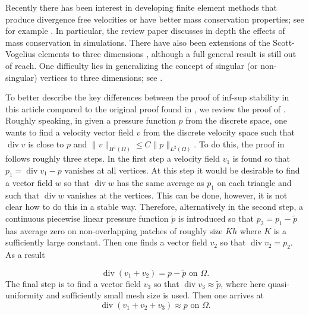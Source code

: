 \documentclass[11pt]{amsart}
\numberwithin{equation}{section}
\newcommand{\dive}{\operatorname{div}}
\theoremstyle{definition}
\begin{document}
Recently there has been interest in developing finite element methods that produce divergence free velocities or have better mass conservation properties; see for example 
\cite{
 arnold1992quadratic,
 cockburn2005locally,
 evans2013isogeometric,
 falk2013stokes,
 guzman2012family,
 guzman2014conforming2,
 guzman2014conforming,
2016arXiv160508657H,
john2016divergence,
 linke2009collision,
 lovadina2015divergence,
 neilan2015discrete,
 ref:QinThesis,
 tai2006discrete,
 zhang2007family,
zhang2011divergence}.  
In particular, the review paper \cite{john2016divergence} discusses in depth the effects of mass conservation in simulations. There have also been 
  extensions of the Scott-Vogelius elements to three dimensions \cite{zhang2007family, zhang2011divergence, neilan2015discrete}, although a full general result is  still  out of reach. One difficulty lies in generalizing the concept of singular (or non-singular) vertices to three dimensions; see \cite{neilan2015discrete}.  


To better describe the key differences between the proof of inf-sup stability in this article compared to the original proof found in \cite{scott1985norm}, we  review
the proof of \cite{scott1985norm}.  Roughly speaking, in \cite{scott1985norm} given a pressure function $p$ from the discrete  space, one wants to find a velocity vector 
field  $v$ from the discrete velocity space such that $\dive v$ is close to $p$ 
and $\|v\|_{H^1(\Omega)} \le C \|p\|_{L^2(\Omega)}$. 
To do this, the proof in \cite{scott1985norm} follows roughly three steps. In the first step a velocity field $v_1$ is found  so that $p_1=\dive v_1 -p$ vanishes 
at all vertices.  
At this step it would be desirable to find a vector field $w$ so that $\dive w$ has the same average as $p_1$ on each triangle and such that $\dive w$ vanishes at the vertices. This can be done, however, it is not clear how to do this in a stable way. Therefore,   alternatively in the second step,   a continuous piecewise linear pressure  function $\tilde{p}$ is introduced so that   $p_2=p_1-\tilde{p}$ has average zero on non-overlapping patches of roughly size $Kh$ where $K$ is a sufficiently large constant. Then one finds a vector field $v_2$ so that $\dive v_2=p_2$. As a result

\begin{equation*}
\dive (v_1+v_2)=p-\tilde{p} \text{ on } \Omega.
\end{equation*}
The final step is to find a vector field $v_3$ so that $\dive v_3 \approx \tilde{p}$, where here quasi-uniformity and sufficiently small mesh size is used. Then one arrives at
\begin{equation*}
\dive (v_1+v_2+v_3) \approx p \text{ on } \Omega.
\end{equation*}
\end{document}
